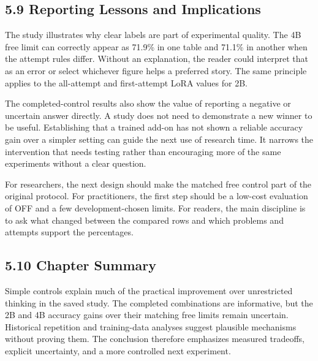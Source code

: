 \documentclass[11pt,letterpaper]{article}
\begin{document}
\subsection*{5.9 Reporting Lessons and Implications}

The study illustrates why clear labels are part of experimental quality. The 4B free limit can correctly appear as 71.9\% in one table and 71.1\% in another when the attempt rules differ. Without an explanation, the reader could interpret that as an error or select whichever figure helps a preferred story. The same principle applies to the all-attempt and first-attempt LoRA values for 2B.\par

The completed-control results also show the value of reporting a negative or uncertain answer directly. A study does not need to demonstrate a new winner to be useful. Establishing that a trained add-on has not shown a reliable accuracy gain over a simpler setting can guide the next use of research time. It narrows the intervention that needs testing rather than encouraging more of the same experiments without a clear question.\par

For researchers, the next design should make the matched free control part of the original protocol. For practitioners, the first step should be a low-cost evaluation of OFF and a few development-chosen limits. For readers, the main discipline is to ask what changed between the compared rows and which problems and attempts support the percentages.\par

\subsection*{5.10 Chapter Summary}

Simple controls explain much of the practical improvement over unrestricted thinking in the saved study. The completed combinations are informative, but the 2B and 4B accuracy gains over their matching free limits remain uncertain. Historical repetition and training-data analyses suggest plausible mechanisms without proving them. The conclusion therefore emphasizes measured tradeoffs, explicit uncertainty, and a more controlled next experiment.\par

\clearpage
\end{document}
